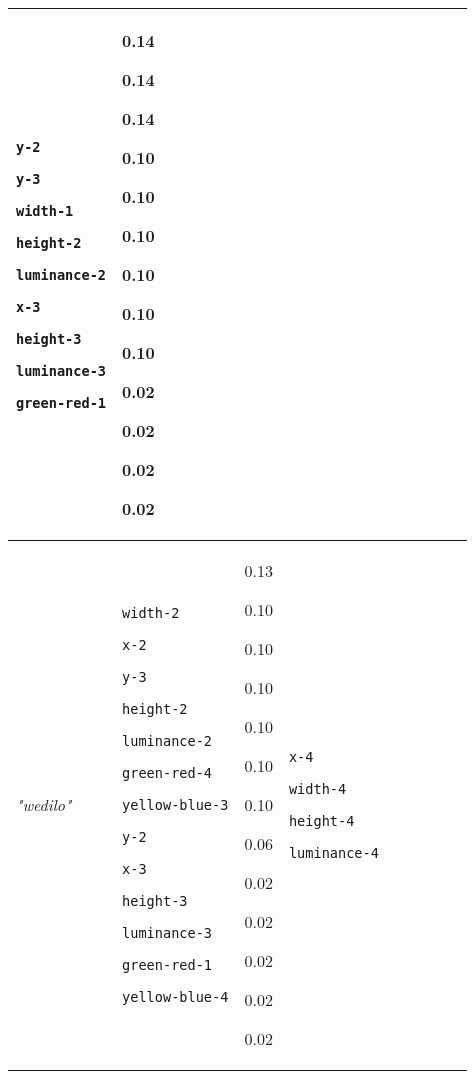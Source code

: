 {\begin{tabular}{@{}p{1.2cm}|p{2.75cm}@{}p{0.8cm}@{}|p{2.75cm}@{}p{0.8cm}@{}|p{2.75cm}@{}p{0.8cm}@{}|p{2.75cm}@{}p{0.8cm}@{}}
\texttt{y-2}

\texttt{y-3}

\texttt{width-1}

\texttt{height-2}

\texttt{luminance-2}

\texttt{x-3}

\texttt{height-3}

\texttt{luminance-3}

\texttt{green-red-1} & 0.14

0.14

0.14

0.10

0.10

0.10

0.10

0.10

0.10

0.02

0.02

0.02

0.02\\
\hline
\textit{"wedilo"} & \texttt{width-2}

\texttt{x-2}

\texttt{y-3}

\texttt{height-2}

\texttt{luminance-2}

\texttt{green-red-4}

\texttt{yellow-blue-3}

\texttt{y-2}

\texttt{x-3}

\texttt{height-3}

\texttt{luminance-3}

\texttt{green-red-1}

\texttt{yellow-blue-4} & 0.13

0.10

0.10

0.10

0.10

0.10

0.10

0.06

0.02

0.02

0.02

0.02

0.02 & \texttt{x-4}

\texttt{width-4}

\texttt{height-4}

\texttt{luminance-4}


\end{tabular}}
